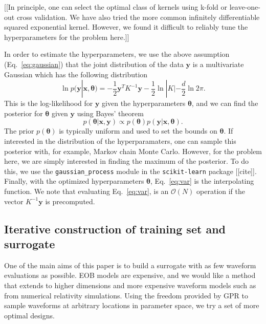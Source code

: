 \documentclass[prd,aps,letter,twocolumn,floatfix,notitlepage,nofootinbib]{revtex4-1}
\begin{document}
[[In principle, one can select the optimal class of kernels using k-fold or leave-one-out cross validation. We have also tried the 
more common infinitely differentiable squared exponential kernel. However, we found it difficult to reliably tune the 
hyperparameters for the problem here.]]

In order to estimate the hyperparameters, we use the above assumption (Eq.~\eqref{eq:gaussian}) that the joint distribution of 
the data ${\bm y}$ is a multivariate Gaussian which has the following distribution
\begin{equation}
\ln p({\bm y} | {\bm x}, {\bm \theta}) = -\frac{1}{2}{\bm y}^T K^{-1} {\bm y} - \frac{1}{2} \ln |K| - \frac{d}{2} \ln 2\pi.
\end{equation}
This is the log-likelihood for ${\bm y}$ given the hyperparameters ${\bm \theta}$, and we can find the posterior for ${\bm \theta}$
given ${\bm y}$ using Bayes' theorem
\begin{equation}
p({\bm \theta} | {\bm x}, {\bm y}) \propto p({\bm \theta}) p({\bm y} | {\bm x}, {\bm \theta}).
\end{equation}
The prior $p({\bm \theta})$ is typically uniform and used to set the bounds on ${\bm \theta}$. If interested in the distribution of the 
hyperparamaters, one can sample this posterior with, for example, Markov chain Monte Carlo. However, for the problem here, we are
simply interested in finding the maximum of the posterior. To do this, we use the \texttt{gaussian\_process} module in the
\texttt{scikit-learn} package [[cite]]. Finally, with the optimized hyperparameters ${\bm \theta}$, Eq.~\eqref{eq:var} is the 
interpolating function. We note that evaluating Eq.~\eqref{eq:var}, is an $\mathcal{O}(N)$ operation if the vector $K^{-1}{\bm y}$ is
precomputed.


\subsection{Iterative construction of training set and surrogate}

One of the main aims of this paper is to build a surrogate with as few waveform evaluations as possible. EOB models are expensive, and we would like a method that extends to higher dimensions and more expensive waveform models such as from numerical relativity simulations. Using the freedom provided by GPR to sample waveforms at arbitrary locations in parameter space, we try a set of more optimal designs. 
\end{document}
